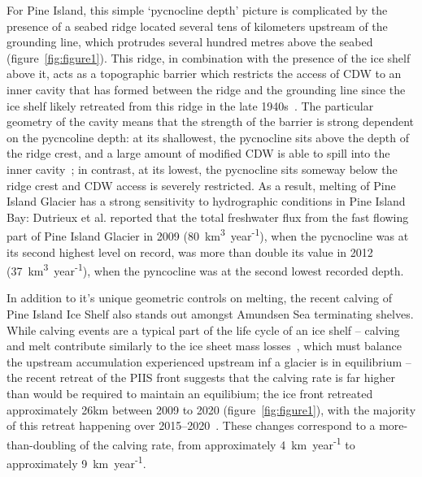 \documentclass[draft]{agujournal2019}
\begin{document}
For Pine Island, this simple `pycnocline depth' picture is complicated by the presence of a seabed ridge located several tens of kilometers upstream of the grounding line, which protrudes several hundred metres above the seabed (figure~\ref{fig:figure1}). This ridge, in combination with the presence of the ice shelf above it, acts as a topographic barrier which restricts the access of CDW to an inner cavity that has formed between the ridge and the grounding line since the ice shelf likely retreated from this ridge in the late 1940s~\cite{Jenkins2010NatureGeo, DeRydt2014JGeophysResOceans, DeRydt2016JGeophysResEarthSurf}. The particular geometry of the cavity means that the strength of the barrier is strong dependent on the pycncoline depth: at its shallowest, the pycnocline sits above the depth of the ridge crest, and a large amount of modified CDW is able to spill into the inner cavity~\citep{Dutrieux2014Science}; in contrast, at its lowest, the pycnocline sits someway below the ridge crest and CDW access is severely restricted.  As a result, melting of Pine Island Glacier has a strong sensitivity to hydrographic conditions in Pine Island Bay: Dutrieux et al. reported that the total freshwater flux from the fast flowing part of Pine Island Glacier in 2009 (80~km\textsuperscript{3}~year\textsuperscript{-1}), when the pycnocline was at its second highest level on record, was more than double its value in 2012 (37~km\textsuperscript{3}~year\textsuperscript{-1}), when the pyncocline was at the second lowest recorded depth.

In addition to it's unique geometric controls on melting, the recent calving of Pine Island Ice Shelf also stands out amongst Amundsen Sea terminating shelves. While calving events are a typical part of the life cycle of an ice shelf -- calving and melt contribute similarly to the ice sheet mass losses~\cite{Rignot2013Science}, which must balance the upstream accumulation experienced upstream inf a glacier is in equilibrium -- the recent retreat of the PIIS front suggests that the calving rate is far higher than would be required to maintain an equilibium; the ice front retreated approximately 26km between 2009 to 2020 (figure~\ref{fig:figure1}), with the majority of this retreat happening over 2015--2020~\cite{Lhermitte2020PNAS, Joughin2021ScienceAdv}. These changes correspond to a more-than-doubling of the calving rate, from approximately 4~km~year\textsuperscript{-1} to approximately 9~km~year\textsuperscript{-1}.
\end{document}
